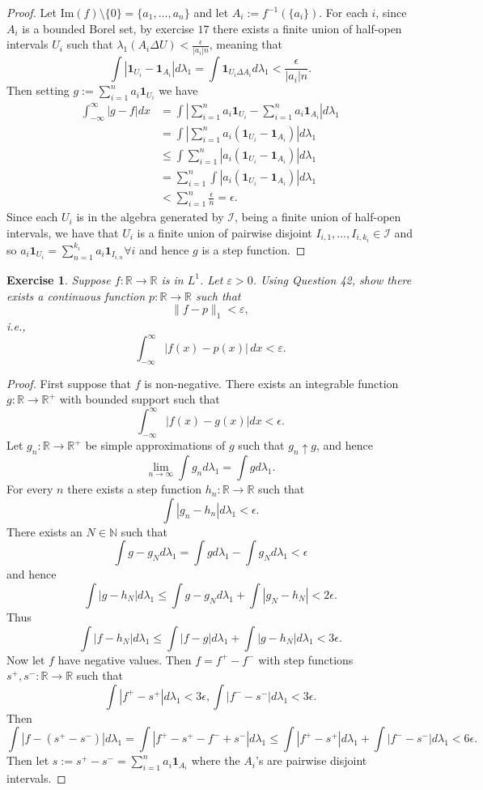 \documentclass{article}
\newtheorem{exercise}[theorem]{Exercise}
\begin{document}
\begin{proof}
Let $\text{Im}(f)\setminus\{0\}=\{a_1,...,a_n\}$ and let $A_i:=f^{-1}(\{a_i\})$. For each $i$, since $A_i$ is a bounded Borel set, by exercise $17$ there exists a finite union of half-open intervals $U_i$ such that $\lambda_1(A_i\Delta U)<\frac{\epsilon}{|a_i|n}$, meaning that \[\int|\mathbf{1}_{U_i}-\mathbf{1}_{A_i}|d\lambda_1=\int\mathbf{1}_{U_i\Delta A_i}d\lambda_1<\frac{\epsilon}{|a_i|n}.\] Then setting $g:=\sum_{i=1}^na_i\mathbf{1}_{U_i}$ we have\begin{align*}\int_{-\infty}^\infty|g-f|dx&=\int|\sum_{i=1}^na_i\mathbf{1}_{U_i}-\sum_{i=1}^na_i\mathbf{1}_{A_i}|d\lambda_1\\&=\int|\sum_{i=1}^na_i(\mathbf{1}_{U_i}-\mathbf{1}_{A_i})|d\lambda_1\\&\leq\int\sum_{i=1}^n|a_i(\mathbf{1}_{U_i}-\mathbf{1}_{A_i})|d\lambda_1\\&=\sum_{i=1}^n\int|a_i(\mathbf{1}_{U_i}-\mathbf{1}_{A_i})|d\lambda_1\\&<\sum_{i=1}^n\frac{\epsilon}{n}=\epsilon.\end{align*} Since each $U_i$ is in the algebra generated by $\mathcal{I}$, being a finite union of half-open intervals, we have that $U_i$ is a finite union of pairwise disjoint $I_{i,1},...,I_{i,k_i}\in\mathcal{I}$ and so $a_i\mathbf{1}_{U_i}=\sum_{n=1}^{k_i}a_i\mathbf{1}_{I_{i,n}}\forall i$ and hence $g$ is a step function.
\end{proof}
\begin{exercise}
Suppose \( f : \mathbb{R} \to \mathbb{R} \) is in \( L^1 \). Let \( \varepsilon > 0 \). Using Question 42, show there exists a continuous function \( p : \mathbb{R} \to \mathbb{R} \) such that 
\[
\|f - p\|_1 < \varepsilon,
\]
i.e., 
\[
\int_{-\infty}^{\infty} |f(x) - p(x)| \,dx < \varepsilon.
\]
\end{exercise}
\begin{proof}
First suppose that $f$ is non-negative. There exists an integrable function $g:\mathbb{R}\to\mathbb{R}^+$ with bounded support such that \[\int_{-\infty}^\infty|f(x)-g(x)|dx<\epsilon.\] Let $g_n:\mathbb{R}\to\mathbb{R}^+$ be simple approximations of $g$ such that $g_n\uparrow g$, and hence \[\lim_{n\to\infty}\int g_nd\lambda_1=\int gd\lambda_1.\] For every $n$ there exists a step function $h_n:\mathbb{R}\to\mathbb{R}$ such that \[\int|g_n-h_n|d\lambda_1<\epsilon.\] There exists an $N\in\mathbb{N}$ such that \[\int g-g_Nd\lambda_1=\int gd\lambda_1-\int g_Nd\lambda_1<\epsilon\]and hence\[\int|g-h_N|d\lambda_1\leq\int g-g_Nd\lambda_1+\int|g_N-h_N|<2\epsilon.\]Thus \[\int|f-h_N|d\lambda_1\leq\int|f-g|d\lambda_1+\int|g-h_N|d\lambda_1<3\epsilon.\]Now let $f$ have negative values. Then $f=f^+-f^-$ with step functions $s^+,s^-:\mathbb{R}\to\mathbb{R}$ such that \[\int|f^+-s^+|d\lambda_1<3\epsilon,\int|f^--s^-|d\lambda_1<3\epsilon.\]Then \[\int|f-(s^+-s^-)|d\lambda_1=\int|f^+-s^+-f^-+s^-|d\lambda_1\leq\int|f^+-s^+|d\lambda_1+\int|f^--s^-|d\lambda_1<6\epsilon.\]Then let $s:=s^+-s^-=\sum_{i=1}^na_i\mathbf{1}_{A_i}$ where the $A_i$'s are pairwise disjoint intervals.

\end{proof}
\end{document}
